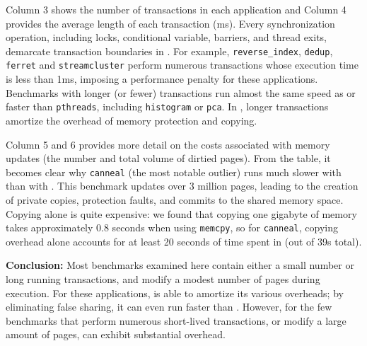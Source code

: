 Column 3 shows the number of transactions in each application and
Column 4 provides the average length of each transaction (ms).  Every
synchronization operation, including locks, conditional variable,
barriers, and thread exits, demarcate transaction boundaries
in \dthreads{}.  For
example, \texttt{reverse\_index}, \texttt{dedup}, \texttt{ferret}
and \texttt{streamcluster} perform numerous transactions whose
execution time is less than 1ms, imposing a performance penalty for
these applications.  Benchmarks with longer (or fewer) transactions run
almost the same speed as or faster than \texttt{pthreads},
including \texttt{histogram} or \texttt{pca}.  In \dthreads{}, longer
transactions amortize the overhead of memory protection and copying.

Column 5 and 6 provides more detail on the costs associated with
memory updates (the number and total volume of dirtied pages). From
the table, it becomes clear why \texttt{canneal} (the most notable
outlier) runs much slower with \dthreads{} than with \pthreads{}. This benchmark
updates over 3 million pages, leading to the creation of
private copies, protection faults, and commits to the shared memory
space. Copying alone is quite expensive: we found that copying one
gigabyte of memory takes approximately 0.8 seconds when
using \texttt{memcpy}, so for \texttt{canneal}, copying overhead alone
accounts for at least 20 seconds of time spent in \dthreads{} (out of
39s total).

\textbf{Conclusion: }
Most benchmarks examined here contain either a small number or long
running transactions, and modify a modest number of pages during
execution. For these applications, \dthreads{} is able to amortize its
various overheads; by eliminating false sharing, it can even run faster than
\pthreads{}. However, for the few benchmarks that perform numerous short-lived
transactions, or modify a large amount of pages, \dthreads{} can
exhibit substantial overhead.



